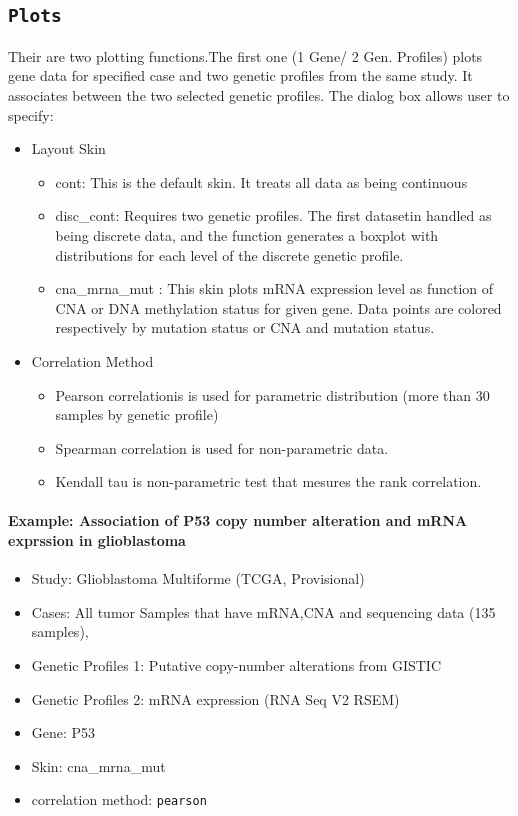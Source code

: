 \documentclass[a4paper]{article}
\begin{document}
\subsection{\texttt{Plots}}
Their are two plotting functions.The first one (1 Gene/ 2 Gen. Profiles) plots gene data for specified  case and two genetic profiles from the same study. It associates between the two selected genetic profiles. The dialog box allows user to specify:
\begin{itemize}
\item Layout Skin

\begin{itemize}
\item cont: This is the default skin. It treats all data as being continuous
\item disc\_cont: Requires two genetic profiles. The first datasetin handled as being discrete data, and the function generates a boxplot with distributions for each level of the discrete genetic profile.
\item cna\_mrna\_mut : This skin plots mRNA expression level as function of CNA or DNA methylation status for given gene. Data points are colored respectively by mutation status or CNA and mutation status.
\end{itemize}

\item Correlation Method
\begin{itemize}
\item Pearson correlationis is used for parametric distribution (more than 30 samples by genetic profile)
\item Spearman correlation is used for non-parametric data.
\item Kendall tau is non-parametric test that mesures the rank correlation. 
\end{itemize}

\end{itemize}

\paragraph{Example: Association  of P53 copy number alteration and mRNA exprssion in glioblastoma}

\begin{itemize}
    \item Study:  Glioblastoma Multiforme (TCGA, Provisional)
    \item Cases: All tumor Samples that have mRNA,CNA and sequencing data (135 samples),
    \item Genetic Profiles 1: Putative copy-number alterations from GISTIC
    \item Genetic Profiles 2: mRNA expression (RNA Seq V2 RSEM)
    \item Gene: P53
    \item  Skin: cna\_mrna\_mut
    \item correlation method: \texttt{pearson}
 \end{itemize}
\end{document}

